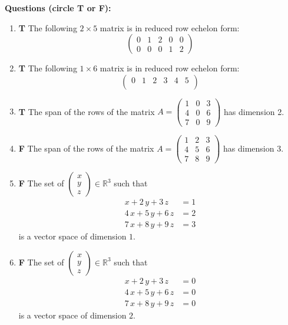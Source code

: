 \documentclass[12pt]{article}
\newcommand{\tf}[2]{\item {\bf {\color{blue}\hspace{1em}#1}}\hspace{1em} #2}
\newcommand{\R}{\mathbb{R}}
\begin{document}
{\noindent\bf \color{red} Questions (circle T or F):}
\begin{enumerate}

\tf{T}{The following $2\times 5$ matrix is in reduced row echelon form:
$$\left(\begin{array}{rrrrr}
0 & 1 & 2 & 0 & 0\\
0 & 0 & 0 & 1 & 2
\end{array}\right)
$$
}

\tf{T}{The following $1\times 6$ matrix is in reduced row echelon form:
$$\left(\begin{array}{rrrrrr}
0 & 1 & 2 & 3 & 4 & 5\\
\end{array}\right)
$$
}

\tf{T}{The span of the rows of the matrix $A=\left(\begin{array}{rrr}
1 & 0 & 3 \\
4 & 0 & 6 \\
7 & 0 & 9
\end{array}\right)$ has dimension 2.}

\tf{F}{The span of the rows of the matrix $A=\left(\begin{array}{rrr}
1 & 2 & 3 \\
4 & 5 & 6 \\
7 & 8 & 9
\end{array}\right)$ has dimension 3.}

\tf{F}{The set of $\left(\begin{array}{c}
x \\
y\\
z
\end{array}\right)\in \R^3$ such that
\begin{align*}
x + 2 \, y + 3 \, z &= 1 \\
4 \, x + 5 \, y + 6 \, z &= 2\\
7 \, x + 8 \, y + 9 \, z &= 3
\end{align*}
is a vector space of dimension $1$.}

\tf{F}{The set of $\left(\begin{array}{c}
x \\
y\\
z
\end{array}\right)\in \R^3$ such that
\begin{align*}
x + 2 \, y + 3 \, z &= 0 \\
4 \, x + 5 \, y + 6 \, z &= 0\\
7 \, x + 8 \, y + 9 \, z &= 0
\end{align*}
is a vector space of dimension $2$.}


\end{enumerate}
\end{document}
